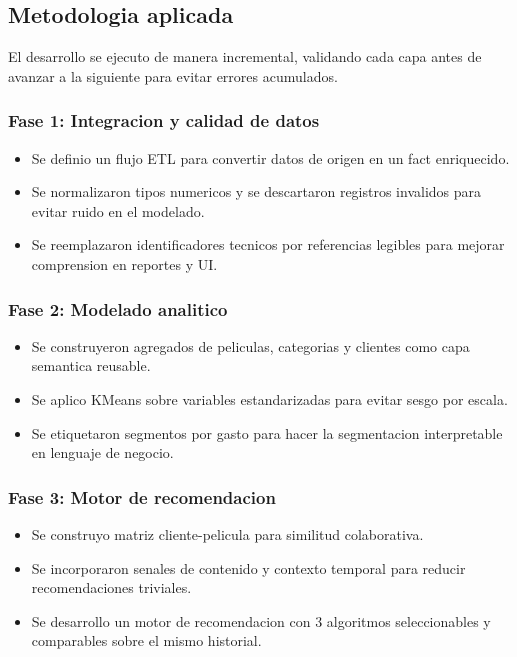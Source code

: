 ﻿\documentclass{article}
\begin{document}
\subsection{Metodologia aplicada}
El desarrollo se ejecuto de manera incremental, validando cada capa antes de avanzar a la siguiente para evitar errores acumulados.

\subsubsection{Fase 1: Integracion y calidad de datos}
\begin{itemize}
    \item Se definio un flujo ETL para convertir datos de origen en un fact enriquecido.
    \item Se normalizaron tipos numericos y se descartaron registros invalidos para evitar ruido en el modelado.
    \item Se reemplazaron identificadores tecnicos por referencias legibles para mejorar comprension en reportes y UI.
\end{itemize}

\subsubsection{Fase 2: Modelado analitico}
\begin{itemize}
    \item Se construyeron agregados de peliculas, categorias y clientes como capa semantica reusable.
    \item Se aplico KMeans sobre variables estandarizadas para evitar sesgo por escala.
    \item Se etiquetaron segmentos por gasto para hacer la segmentacion interpretable en lenguaje de negocio.
\end{itemize}

\subsubsection{Fase 3: Motor de recomendacion}
\begin{itemize}
    \item Se construyo matriz cliente-pelicula para similitud colaborativa.
    \item Se incorporaron senales de contenido y contexto temporal para reducir recomendaciones triviales.
    \item Se desarrollo un motor de recomendacion con 3 algoritmos seleccionables y comparables sobre el mismo historial.
\end{itemize}
\end{document}
